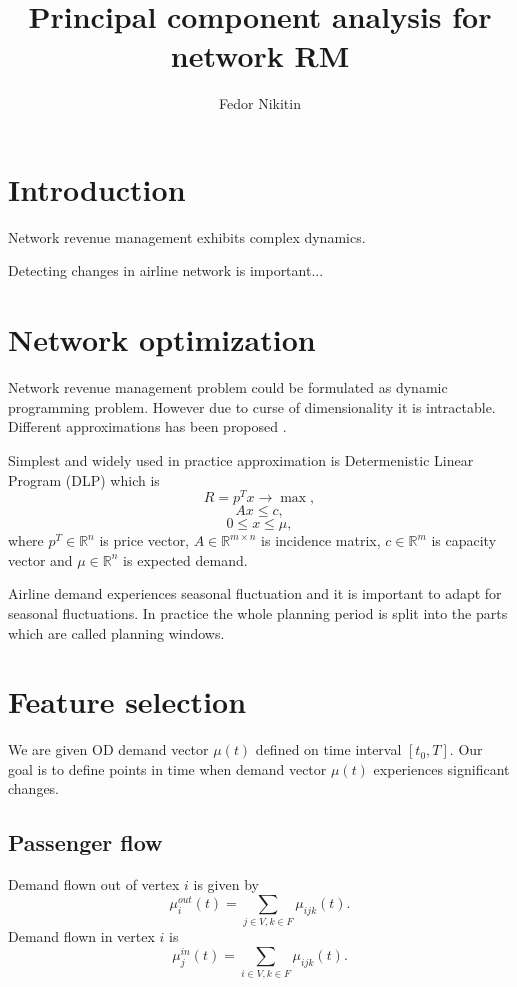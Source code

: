 \documentclass[a4paper,oneside]{article}
\title{Principal component analysis for network RM}
\author{Fedor Nikitin}
\begin{document}
\maketitle

\section{Introduction}
Network revenue management exhibits complex dynamics.

Detecting changes in airline network is important...

\section{Network optimization}
Network revenue management problem could be formulated as
dynamic programming problem. However due to curse of dimensionality
it is intractable. Different approximations has been proposed \cite{...}.

Simplest and widely used in practice approximation is Determenistic Linear Program
(DLP) which is
\begin{equation}
R = p^T x \rightarrow \max,
\label{primal_target}
\end{equation}
\begin{equation}
Ax \leq c,
\label{primal_capacity}
\end{equation}
\begin{equation}
0 \leq x \leq \mu,
\label{primal_demand}
\end{equation}
where $p^T\in \mathbb{R}^n$ is price vector, $A\in \mathbb{R}^{m\times n}$ is
incidence matrix, $c\in \mathbb{R}^m$ is capacity vector and $\mu\in \mathbb{R}^n$ is expected
demand.

Airline demand experiences seasonal fluctuation and it is important to adapt for seasonal 
fluctuations. In practice the whole planning period is split into the parts which are called
planning windows.

\section{Feature selection}
We are given OD demand vector $\mu(t)$ defined on time interval $[t_0,T]$. Our goal 
is to define points in time when demand vector $\mu(t)$ experiences significant changes.

\subsection{Passenger flow}
Demand flown out of vertex $i$ is given by
$$
\mu_{i}^{out}(t) = \sum_{j\in V, k\in F} \mu_{ijk}(t).
$$
Demand flown in vertex $i$ is 
$$
\mu_{j}^{in}(t) = \sum_{i\in V, k\in F} \mu_{ijk}(t).
$$
\end{document}
